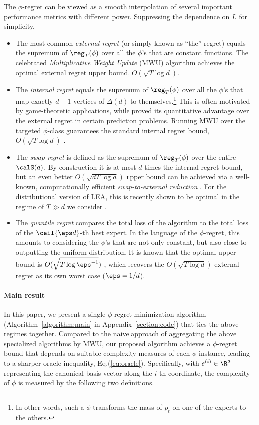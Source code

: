 \documentclass[10pt]{article}
\begin{document}
The $\phi$-regret can be viewed as a smooth interpolation of several important performance metrics with different power. Suppressing the dependence on $L$ for simplicity, 
\begin{itemize}
\item The most common \emph{external regret} (or simply known as ``the'' regret) equals the supremum of $\reg_T(\phi)$ over all the $\phi$'s that are constant functions. The celebrated \emph{Multiplicative Weight Update} (MWU) algorithm \citep{littlestone1994weighted,cesa1997use} achieves the optimal external regret upper bound, $O(\sqrt{T\log d})$. 
\item The \emph{internal regret} \citep{foster1999regret} equals the supremum of $\reg_T(\phi)$ over all the $\phi$'s that map exactly $d-1$ vertices of $\Delta(d)$ to themselves.\footnote{In other words, such a $\phi$ transforms the mass of $p_t$ on one of the experts to the others.} This is often motivated by game-theoretic applications, while \cite{stoltz2005internal} proved its quantitative advantage over the external regret in certain prediction problems. Running MWU over the targeted $\phi$-class guarantees the standard internal regret bound, $O(\sqrt{T\log d})$ \citep[Chapter~4.4]{cesa2006prediction}. 
\item The \emph{swap regret} \citep{blum2007external} is defined as the supremum of $\reg_T(\phi)$ over the entire $\calS(d)$. By construction it is at most $d$ times the internal regret bound, but an even better $O(\sqrt{dT\log d})$ upper bound can be achieved via a well-known, computationally efficient \emph{swap-to-external reduction} \citep{blum2007external}. For the distributional version of LEA, this is recently shown to be optimal in the regime of $T\gg d$ we consider \citep{dagan2024external,peng2024fast}. 
\item The \emph{quantile regret} \citep{chaudhuri2009parameter} compares the total loss of the algorithm to the total loss of the $\ceil{\eps d}$-th best expert. In the language of the $\phi$-regret, this amounts to considering the $\phi$'s that are not only constant, but also close to outputting the uniform distribution. It is known that the optimal upper bound is $O(\sqrt{T\log\eps^{-1}})$ \citep{orabona2016coin,negrea2021minimax}, which recovers the $O(\sqrt{T\log d})$ external regret as its own worst case ($\eps=1/d$).
\end{itemize}

\paragraph{Main result} In this paper, we present a single $\phi$-regret minimization algorithm (Algorithm~\ref{algorithm:main} in Appendix~\ref{section:code}) that ties the above regimes together. Compared to the naive approach of aggregating the above specialized algorithms by MWU, our proposed algorithm achieves a $\phi$-regret bound that depends on suitable complexity measures of each $\phi$ instance, leading to a sharper oracle inequality, Eq.(\ref{eq:oracle}). Specifically, with $e^{(i)}\in\R^d$ representing the canonical basis vector along the $i$-th coordinate, the complexity of $\phi$ is measured by the following two definitions. 
\end{document}
